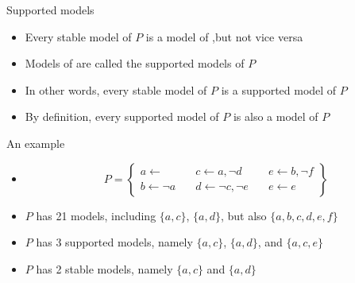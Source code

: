 \begin{frame}{Supported models}
  \bigskip
  \begin{itemize}
  \item<1-> Every stable model of $P$ is a model of ,\pause[2]
    but not vice versa
    \smallskip
  \item<3-> Models of  are called the \alert{supported models} of $P$
    \bigskip
  \item<4-> In other words, every stable model of $P$ is a supported model of $P$
  \item<4-> By definition, every supported model of $P$ is also a model of $P$
\end{itemize}

\end{frame}
\begin{frame}{An example}
  \bigskip
  \begin{itemize}
  \item<1-> []
    \[
    P
    =
    \left\{
      \begin{array}{lll}
        a \leftarrow                  \quad &
        c \leftarrow a, \neg d       \quad &
        e \leftarrow b, \neg f
        \\
        b \leftarrow \neg a          \quad &
        d \leftarrow \neg c, \neg e \quad &
        e \leftarrow e
      \end{array}
    \right\}
    \]
  \bigskip
  \item<2-> $P$ has 21           models, including $\{a,c\}$, $\{a,d\}$, but also $\{a,b,c,d,e,f\}$
  \item<3-> $P$ has  3 supported models, namely $\{a,c\}$, $\{a,d\}$, and $\{a,c,e\}$
  \item<4-> $P$ has  2 stable    models, namely $\{a,c\}$ and $\{a,d\}$
  \end{itemize}

\end{frame}
%
